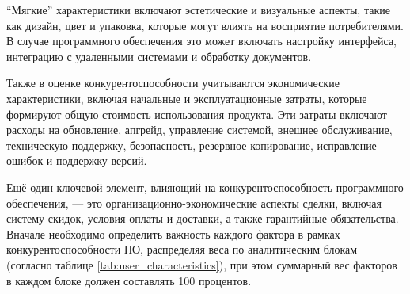 “Мягкие” характеристики включают эстетические и визуальные аспекты, такие как дизайн, цвет и упаковка, которые могут влиять на восприятие потребителями. В случае программного обеспечения это может включать настройку интерфейса, интеграцию с удаленными системами и обработку документов.

Также в оценке конкурентоспособности учитываются экономические характеристики, включая начальные и эксплуатационные затраты, которые формируют общую стоимость использования продукта. Эти затраты включают расходы на обновление, апгрейд, управление системой, внешнее обслуживание, техническую поддержку, безопасность, резервное копирование, исправление ошибок и поддержку версий.

Ещё один ключевой элемент, влияющий на конкурентоспособность программного обеспечения, — это организационно-экономические аспекты сделки, включая систему скидок, условия оплаты и доставки, а также гарантийные обязательства. Вначале необходимо определить важность каждого фактора в рамках конкурентоспособности ПО, распределяя веса по аналитическим блокам (согласно таблице \ref{tab:user_characteristics}), при этом суммарный вес факторов в каждом блоке должен составлять 100 процентов.

